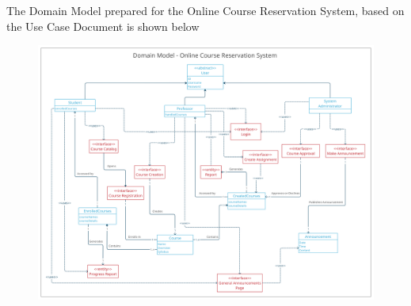\documentclass[12pt, a4]{report}
\begin{document}
\maketitle

\newpage
\centering
The Domain Model prepared for the Online Course Reservation System, based on the Use Case Document is shown below
\begin{figure}[h]
    \includegraphics[width=\textwidth]{Diagrams/Domain Model.png}
\end{figure}
\end{document}
